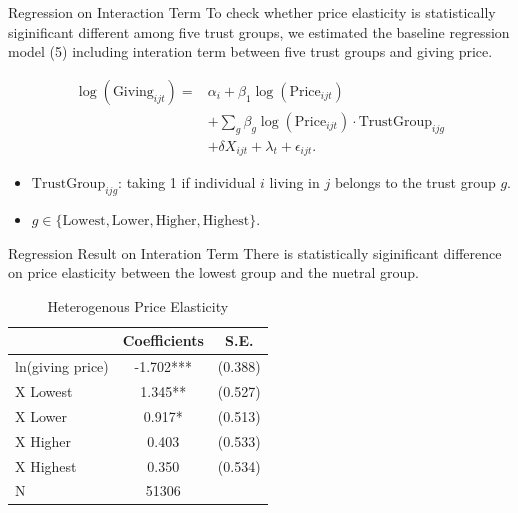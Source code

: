 \documentclass[
  ignorenonframetext,
]{beamer}
\providecommand{\tightlist}{%
  \setlength{\itemsep}{0pt}\setlength{\parskip}{0pt}}
\begin{document}
\begin{frame}{Regression on Interaction Term}
\protect\hypertarget{regression-on-interaction-term}{}
To check whether price elasticity is statistically siginificant
different among five trust groups, we estimated the baseline regression
model (5) including interation term between five trust groups and giving
price.

\begin{align*}
    \log(\text{Giving}_{ijt}) 
    =& \alpha_i + \beta_1 \log(\text{Price}_{ijt}) \\
    &+ \sum_g \beta_g \log(\text{Price}_{ijt}) \cdot \text{TrustGroup}_{ijg}  \\
    &+ \delta X_{ijt} + \lambda_t + \epsilon_{ijt}.
\end{align*}

\begin{itemize}
\tightlist
\item
  \(\text{TrustGroup}_{ijg}\): taking 1 if individual \(i\) living in
  \(j\) belongs to the trust group \(g\).
\item
  \(g \in \{ \text{Lowest}, \text{Lower}, \text{Higher}, \text{Highest} \}\).
\end{itemize}
\end{frame}

\begin{frame}{Regression Result on Interation Term}
\protect\hypertarget{regression-result-on-interation-term}{}
There is statistically siginificant difference on price elasticity
between the lowest group and the nuetral group.

\begin{table}

\caption{\label{tab:kableEstimateInteractionByTrustGroup}Heterogenous Price Elasticity}
\centering
\begin{tabular}[t]{lcc}
\toprule
 & Coefficients & S.E.\\
\midrule
ln(giving price) & -1.702*** & (0.388)\\
\hspace{1em}X Lowest & 1.345** & (0.527)\\
\hspace{1em}X Lower & 0.917* & (0.513)\\
\hspace{1em}X Higher & 0.403 & (0.533)\\
\hspace{1em}X Highest & 0.350 & (0.534)\\
N & 51306 & \\
\bottomrule
\end{tabular}
\end{table}
\end{frame}
\end{document}
